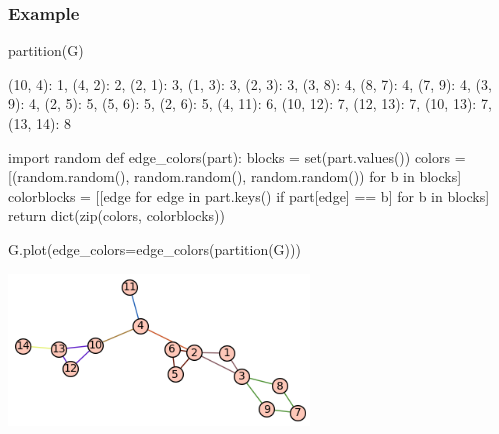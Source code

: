\subsubsection*{Example}

\begin{sageCell}
    partition(G)
\end{sageCell}
\begin{outCell}
    {(10, 4): 1,
     (4, 2): 2,
     (2, 1): 3,
     (1, 3): 3,
     (2, 3): 3,
     (3, 8): 4,
     (8, 7): 4,
     (7, 9): 4,
     (3, 9): 4,
     (2, 5): 5,
     (5, 6): 5,
     (2, 6): 5,
     (4, 11): 6,
     (10, 12): 7,
     (12, 13): 7,
     (10, 13): 7,
     (13, 14): 8}
\end{outCell}

\begin{sageCell}
import random
def edge_colors(part):
    blocks = set(part.values())
    colors = [(random.random(), random.random(), random.random()) for b in blocks]
    colorblocks = [[edge for edge in part.keys() if part[edge] == b] for b in blocks]
    return dict(zip(colors, colorblocks))
\end{sageCell}
\begin{sageCell}
    G.plot(edge_colors=edge_colors(partition(G)))
\end{sageCell}
\begin{outImage}
    \includegraphics[width=0.6\textwidth]{Images/Low/output_partition.png}
\end{outImage}
